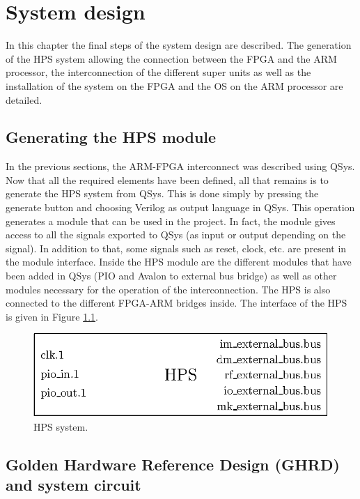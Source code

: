 \chapter{System design}

In this chapter the final steps of the system design are described. The generation of the HPS 
system allowing the connection between the FPGA and the ARM processor, the interconnection of the 
different super units as well as the installation of the system on the FPGA and the OS on the 
ARM processor are detailed.

\section{Generating the HPS module}

In the previous sections, the ARM-FPGA interconnect was described using QSys. Now that all the 
required elements have been defined, all that remains is to generate the HPS system from QSys. 
This is done simply by pressing the generate button and choosing Verilog as output language in QSys.
This operation generates a module that can be used in the project. In fact, the module gives access 
to all the signals exported to QSys (as input or output depending on the signal). In addition to 
that, some signals such as reset, clock, etc. are present in the module interface. Inside the HPS 
module are the different modules that have been added in QSys (PIO and Avalon to external bus bridge) 
as well as other modules necessary for the operation of the interconnection. The HPS is also 
connected to the different FPGA-ARM bridges inside. The interface of the HPS is given in 
Figure \ref{fig:system/hps}.

\begin{figure}[H]
    \centering
    \includegraphics[scale=0.8]{Chapter6-System/res/hps.eps}
    \caption{HPS system.}
    \label{fig:system/hps}
\end{figure}

\section{Golden Hardware Reference Design (GHRD) and system circuit}

